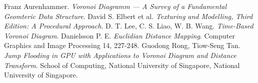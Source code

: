 \documentclass[12pt]{article}
\begin{document}
\pagebreak

\begin{thebibliography}{10}
 Franz Aurenhammer. \textit{Voronoi Diagramm --- A Survey of a Fundamental Geomteric Data Structure}.
 David S. Elbert et al. \textit{Texturing and Modelling, Third Edition: A Procedural Approach}.
 D. T. Lee, C. S. Liao, W. B. Wang. \textit{Time-Based Voronoi Diagram}.
 Danielsson P. E. \textit{Euclidian Distance Mapping}. Computer Graphics and Image Processing 14, 227-248.
 Guodong Rong, Tiow-Seng Tan. \textit{Jump Flooding in GPU with Applications to Voronoi Diagram and Distance Transform}. School of Computing, National University of Singapore, National University of Singapore. 
\end{thebibliography}
\end{document}
